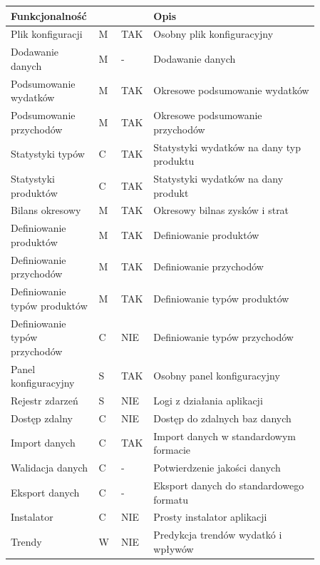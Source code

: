 \documentclass[a4paper,10pt, twoside]{report}
\newcommand{\customstyletable}[1]{\footnotesize{\textbf{#1}}}
\newcommand{\customstyletablecentered}[1]{\footnotesize\centering{\textbf{#1}}}
\begin{document}
\begin{table}[h]
\begin{tabular}{|p{0.2\linewidth}|p{0.07\linewidth}|p{0.07\linewidth}|p{0.52\linewidth}|}
    \customstyletable{Funkcjonalność} & \customstyletablecentered{PRIO} & \customstyletablecentered{IMPL}& \customstyletable{Opis} \\
    \hline
    {Plik konfiguracji} & {M} & {TAK} & {Osobny plik konfiguracyjny}\\
    \hline
    {Dodawanie danych} & {M} & {-} & {Dodawanie danych}\\
    \hline
    {Podsumowanie wydatków} & {M} & {TAK} & {Okresowe podsumowanie wydatków}\\
    \hline
    {Podsumowanie przychodów} & {M} & {TAK} & {Okresowe podsumowanie przychodów}\\
    \hline
    {Statystyki typów} & {C} & {TAK} & {Statystyki wydatków na dany typ produktu}\\
    \hline
    {Statystyki produktów} & {C} & {TAK} & {Statystyki wydatków na dany produkt}\\
    \hline
    {Bilans okresowy} & {M} & {TAK} & {Okresowy bilnas zysków i strat}\\
    \hline
    {Definiowanie produktów} & {M} & {TAK} & {Definiowanie produktów}\\
    \hline
    {Definiowanie przychodów} & {M} & {TAK} & {Definiowanie przychodów}\\
    \hline
    {Definiowanie typów produktów} & {M} & {TAK} & {Definiowanie typów produktów}\\
    \hline
    {Definiowanie typów przychodów} & {C} & {NIE} & {Definiowanie typów przychodów}\\
    \hline
    {Panel konfiguracyjny} & {S} & {TAK} & {Osobny panel konfiguracyjny}\\
    \hline
    {Rejestr zdarzeń} & {S} & {NIE} & {Logi z działania aplikacji}\\
    \hline
    {Dostęp zdalny} & {C} & {NIE} & {Dostęp do zdalnych baz danych}\\
    \hline
    {Import danych} & {C} & {TAK} & {Import danych w standardowym formacie}\\
    \hline
    {Walidacja danych} & {C} & {-} & {Potwierdzenie jakości danych}\\
    \hline
    {Eksport danych} & {C} & {-} & {Eksport danych do standardowego formatu}\\
    \hline
    {Instalator} & {C} & {NIE} & {Prosty instalator aplikacji}\\
    \hline
    {Trendy} & {W} & {NIE} & {Predykcja trendów wydatkó i wpływów}\\

\end{tabular}
\end{table}
\end{document}
